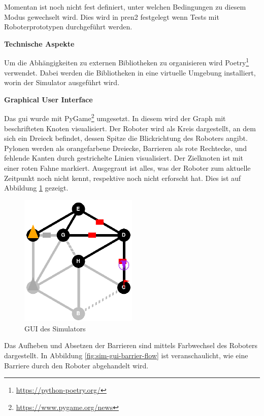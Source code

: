Momentan ist noch nicht fest definiert, unter welchen Bedingungen zu diesem Modus gewechselt wird. Dies wird in \acrshort{pren2} festgelegt wenn Tests mit Roboterprototypen durchgeführt werden.

\textbf{Technische Aspekte}\label{technical-aspect-simulator}

Um die Abhängigkeiten zu externen Bibliotheken zu organisieren wird Poetry\footnote{\url{https://python-poetry.org/}} verwendet. Dabei werden die Bibliotheken in eine virtuelle Umgebung installiert, worin der Simulator ausgeführt wird.

\textbf{Graphical User Interface}\label{gui}

Das \acrshort{gui} wurde mit PyGame\footnote{\url{https://www.pygame.org/news}} umgesetzt. In diesem wird der Graph mit beschrifteten Knoten visualisiert. Der Roboter wird als Kreis dargestellt, an dem sich ein Dreieck befindet, dessen Spitze die Blickrichtung des Roboters angibt. Pylonen werden als orangefarbene Dreiecke, Barrieren als rote Rechtecke, und fehlende Kanten durch gestrichelte Linien visualisiert. Der Zielknoten ist mit einer roten Fahne markiert.
Ausgegraut ist alles, was der Roboter zum aktuelle Zeitpunkt noch nicht kennt, respektive noch nicht erforscht hat. Dies ist auf Abbildung \ref{fig:sim-gui} gezeigt.

\begin{figure}[H]
\centering
\includegraphics[width=0.5\textwidth]{assets/informatik-prototyp/simulator/sim-ui.png}
\caption{GUI des Simulators}
\label{fig:sim-gui}
\end{figure}

Das Aufheben und Absetzen der Barrieren sind mittels Farbwechsel des Roboters dargestellt.
In Abbildung \ref{fig:sim-gui-barrier-flow} ist veranschaulicht, wie eine Barriere durch den Roboter abgehandelt wird.

